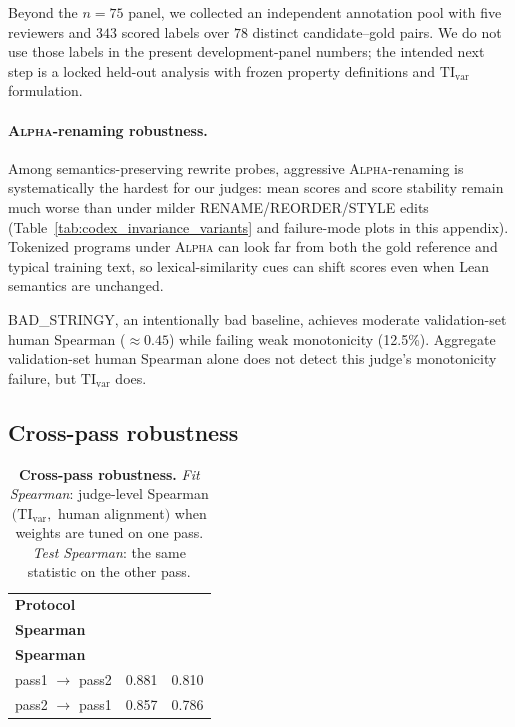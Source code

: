 \documentclass{article}
\begin{document}
Beyond the \(n=75\) panel, we collected an independent annotation pool with five reviewers and \(343\) scored labels over \(78\) distinct candidate--gold pairs. We do not use those labels in the present development-panel numbers; the intended next step is a locked held-out analysis with frozen property definitions and \(\mathrm{TI}_{\mathrm{var}}\) formulation.

\paragraph{\textsc{Alpha}-renaming robustness.}
Among semantics-preserving rewrite probes, aggressive \textsc{Alpha}-renaming is systematically the hardest for our judges: mean scores and score stability remain much worse than under milder RENAME/REORDER/STYLE edits (Table~\ref{tab:codex_invariance_variants} and failure-mode plots in this appendix).
Tokenized programs under \textsc{Alpha} can look far from both the gold reference and typical training text, so lexical-similarity cues can shift scores even when Lean semantics are unchanged.

BAD\_STRINGY, an intentionally bad baseline, achieves moderate validation-set human Spearman (\(\approx0.45\)) while failing weak monotonicity (12.5\%).
Aggregate validation-set human Spearman alone does not detect this judge's monotonicity failure, but \(\mathrm{TI}_{\mathrm{var}}\) does.

\subsection{Cross-pass robustness}
\begin{table}[t]
  \centering
  \small
  \begin{tabular}{lcc}
    \toprule
    \textbf{Protocol}           & \makecell{\textbf{Fit}         \\ \textbf{Spearman}}  & \makecell{\textbf{Test} \\ \textbf{Spearman}} \\
    \midrule
    pass1 \(\rightarrow\) pass2 & 0.881                  & 0.810 \\
    pass2 \(\rightarrow\) pass1 & 0.857                  & 0.786 \\
    \bottomrule
  \end{tabular}
  \caption{\textbf{Cross-pass robustness.}
  \emph{Fit Spearman}: judge-level Spearman\((\mathrm{TI}_{\mathrm{var}},\) human alignment\()\) when weights are tuned on one pass.
  \emph{Test Spearman}: the same statistic on the other pass.}
  \label{tab:cross_pass_generalization}
\end{table}
\end{document}
